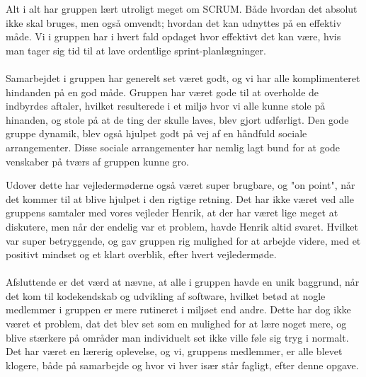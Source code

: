 Alt i alt har gruppen lært utroligt meget om SCRUM. Både hvordan det absolut ikke skal bruges, men også omvendt; hvordan det kan udnyttes på en effektiv måde. Vi i gruppen har i hvert fald opdaget hvor effektivt det kan være, hvis man tager sig tid til at lave ordentlige sprint-planlægninger.
\\\\ %
Samarbejdet i gruppen har generelt set været godt, og vi har alle komplimenteret hindanden på en god måde. Gruppen har været gode til at overholde de indbyrdes aftaler, hvilket resulterede i et miljø hvor vi alle kunne stole på hinanden, og stole på at de ting der skulle laves, blev gjort udførligt. Den gode gruppe dynamik, blev også hjulpet godt på vej af en håndfuld sociale arrangementer. Disse sociale arrangementer har nemlig lagt bund for at gode venskaber på tværs af gruppen kunne gro. 

Udover dette har vejledermøderne også været super brugbare, og "on point", når det kommer til at blive hjulpet i den rigtige retning. Det har ikke været ved alle gruppens samtaler med vores vejleder Henrik, at der har været lige meget at diskutere, men når der endelig var et problem, havde Henrik altid svaret. Hvilket var super betryggende, og gav gruppen rig mulighed for at arbejde videre, med et positivt mindset og et klart overblik, efter hvert vejledermøde.
\\\\
Afsluttende er det værd at nævne, at alle i gruppen havde en unik baggrund, når det kom til kodekendskab og udvikling af software, hvilket betød at nogle medlemmer i gruppen er mere rutineret i miljøet end andre. Dette har dog ikke været et problem, dat det blev set som en mulighed for at lære noget mere, og blive stærkere på områder man individuelt set ikke ville føle sig tryg i normalt. Det har været en lærerig oplevelse, og vi, gruppens medlemmer, er alle blevet klogere, både på samarbejde og hvor vi hver især står fagligt, efter denne opgave.